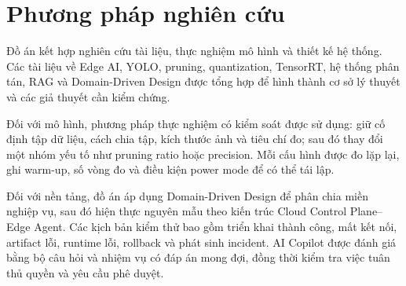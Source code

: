 \section{Phương pháp nghiên cứu}

Đồ án kết hợp nghiên cứu tài liệu, thực nghiệm mô hình và thiết kế hệ thống. Các
tài liệu về Edge AI, YOLO, pruning, quantization, TensorRT, hệ thống phân tán,
RAG và Domain-Driven Design được tổng hợp để hình thành cơ sở lý thuyết và các
giả thuyết cần kiểm chứng.

Đối với mô hình, phương pháp thực nghiệm có kiểm soát được sử dụng: giữ cố
định tập dữ liệu, cách chia tập, kích thước ảnh và tiêu chí đo; sau đó thay đổi một
nhóm yếu tố như pruning ratio hoặc precision. Mỗi cấu hình được đo lặp lại, ghi
warm-up, số vòng đo và điều kiện power mode để có thể tái lập.

Đối với nền tảng, đồ án áp dụng Domain-Driven Design để phân chia miền nghiệp
vụ, sau đó hiện thực nguyên mẫu theo kiến trúc Cloud Control Plane--Edge Agent.
Các kịch bản kiểm thử bao gồm triển khai thành công, mất kết nối, artifact lỗi,
runtime lỗi, rollback và phát sinh incident. AI Copilot được đánh giá bằng bộ câu
hỏi và nhiệm vụ có đáp án mong đợi, đồng thời kiểm tra việc tuân thủ quyền và yêu
cầu phê duyệt.